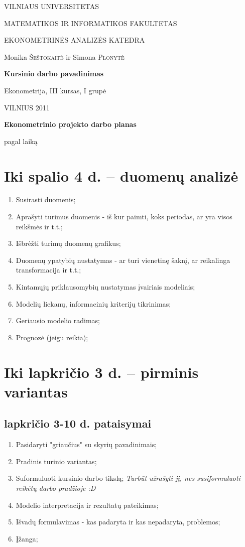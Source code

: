\documentclass[a4paper]{article}
\begin{document}
\begin{titlepage}
\centerline{ \large VILNIAUS UNIVERSITETAS}
\bigskip
\centerline{\large MATEMATIKOS IR INFORMATIKOS FAKULTETAS}
\smallskip

\centerline{\large  EKONOMETRINĖS ANALIZĖS KATEDRA}
\vskip 200pt
\centerline{ \large Monika \textsc{Šeštokaitė} ir \large Simona \textsc{Plonytė}}
\vskip 50pt
\centerline{\bf \Large Kursinio darbo pavadinimas}
\bigskip
\vskip 50pt
\hfill Ekonometrija, III kursas, I grupė
\vskip 100pt
\centerline{\large VILNIUS 2011}
\end{titlepage}

\pagebreak

\centerline{\bf \Large Ekonometrinio projekto darbo planas}
\centerline{pagal laiką}

\section{ Iki spalio 4 d. -- duomenų analizė }


\begin{enumerate}
\item {Susirasti duomenis;}
\item {Aprašyti turimus duomenis - iš kur paimti, koks periodas, ar yra visos reikšmės ir t.t.;}
\item {Išbrėžti turimų duomenų grafikus;}
\item {Duomenų ypatybių nustatymas - ar turi vienetinę šaknį, ar reikalinga transformacija ir t.t.;}
\item {Kintamųjų priklausomybių nustatymas įvairiais modeliais;}
\item {Modelių liekanų, informacinių kriterijų tikrinimas;}
\item {Geriausio modelio radimas;}
\item {{\color{red} Prognozė (jeigu reikia)};}
\end{enumerate}


\section{ Iki lapkričio 3 d. -- pirminis variantas}
\subsection{lapkričio 3-10 d. pataisymai}

\begin{enumerate}
\item {Pasidaryti "griaučius" su skyrių pavadinimais;}
\item {Pradinis turinio variantas;}
\item {Suformuluoti kursinio darbo tikslą;} 
\textit{Turbūt užrašyti jį, nes susiformuluoti reikėtų darbo pradžioje :D}
\item {Modelio interpretacija ir rezultatų pateikimas;}
\item {Išvadų formulavimas - kas padaryta ir kas nepadaryta, problemos;}
\item {Įžanga;}
\end{enumerate}
\end{document}
